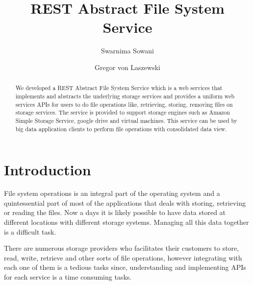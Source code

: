 
\title{REST Abstract File System Service}


\author{Swarnima Sowani}

\author{Gregor von Laszewski}


\renewcommand{\shortauthors}{G. v. Laszewski}


\begin{abstract}
  We developed a REST Abstract File System Service which is a web
  services that implements and abstracts the underlying storage
  services and provides a uniform web services APIs for users to do
  file operations like, retrieving, storing, removing files on storage
  services. The service is provided to support storage engines such as
  Amazon Simple Storage Service, google drive and virtual
  machines. This service can be used by big data application clients
  to perform file operations with consolidated data view.
\end{abstract}



\maketitle


\section{Introduction}

File system operations is an integral part of the operating system and
a quintessential part of most of the applications that deals with
storing, retrieving or reading the files. Now a days it is likely
possible to have data stored at different locations with different
storage systems. Managing all this data together is a difficult task.

There are numerous storage providers who facilitates their customers
to store, read, write, retrieve and other sorts of file operations,
however integrating with each one of them is a tedious tasks since,
understanding and implementing APIs for each service is a time
consuming tasks.

